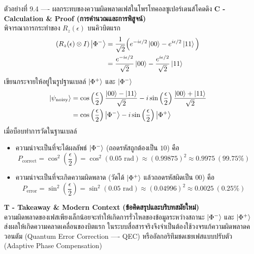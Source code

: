 \begin{psctbox}{ตัวอย่างที่ 9.4 ---- ผลกระทบของความผิดพลาดเฟสในโพรโทคอลซูเปอร์เดนส์โคดดิง}
\vspace{4pt}
\noindent\textbf{C - Calculation \& Proof (การคำนวณและการพิสูจน์)} \\
พิจารณาการกระทำของ $R_z(\epsilon)$ บนคิวบิตแรก
\begin{align}
(R_z(\epsilon) \otimes I) \ket{\Phi^-} &= \frac{1}{\sqrt{2}} \Big( e^{-i\epsilon/2}\ket{00} - e^{i\epsilon/2}\ket{11} \Big) \nonumber \\
&= \frac{e^{-i\epsilon/2}}{\sqrt{2}}\ket{00} - \frac{e^{i\epsilon/2}}{\sqrt{2}}\ket{11}
\end{align}
เขียนกระจายให้อยู่ในรูปฐานเบลล์ $\ket{\Phi^+}$ และ $\ket{\Phi^-}$
\begin{align}
\ket{\psi_{\text{noisy}}} &= \cos\left(\frac{\epsilon}{2}\right) \frac{\ket{00}-\ket{11}}{\sqrt{2}} - i\sin\left(\frac{\epsilon}{2}\right) \frac{\ket{00}+\ket{11}}{\sqrt{2}} \nonumber \\
&= \cos\left(\frac{\epsilon}{2}\right) \ket{\Phi^-} - i\sin\left(\frac{\epsilon}{2}\right) \ket{\Phi^+}
\end{align}
เมื่อบ็อบทำการวัดในฐานเบลล์
\begin{itemize}
    \item ความน่าจะเป็นที่จะได้ผลลัพธ์ $\ket{\Phi^-}$ (ถอดรหัสถูกต้องเป็น $10$) คือ
    \begin{equation}
    P_{\text{correct}} = \cos^2\left(\frac{\epsilon}{2}\right) = \cos^2(0.05\text{ rad}) \approx (0.99875)^2 \approx 0.9975 \ (99.75\%)
    \end{equation}
    \item ความน่าจะเป็นที่จะเกิดความผิดพลาด (วัดได้ $\ket{\Phi^+}$ แล้วถอดรหัสผิดเป็น $00$) คือ
    \begin{equation}
    P_{\text{error}} = \sin^2\left(\frac{\epsilon}{2}\right) = \sin^2(0.05\text{ rad}) \approx (0.04996)^2 \approx 0.0025 \ (0.25\%)
    \end{equation}
\end{itemize}

\vspace{4pt}
\noindent\textbf{T - Takeaway \& Modern Context (ข้อคิดสรุปและบริบทสมัยใหม่)} \\
ความผิดพลาดของเฟสเพียงเล็กน้อยจะทำให้เกิดการรั่วไหลของข้อมูลระหว่างสถานะ $\ket{\Phi^-}$ และ $\ket{\Phi^+}$ ส่งผลให้เกิดความคลาดเคลื่อนของบิตแรก ในระบบสื่อสารจริงจึงจำเป็นต้องใช้วงจรแก้ความผิดพลาดควอนตัม (Quantum Error Correction ---- QEC) หรืออัลกอริทึมชดเชยเฟสแบบปรับตัว (Adaptive Phase Compensation)
\end{psctbox}


